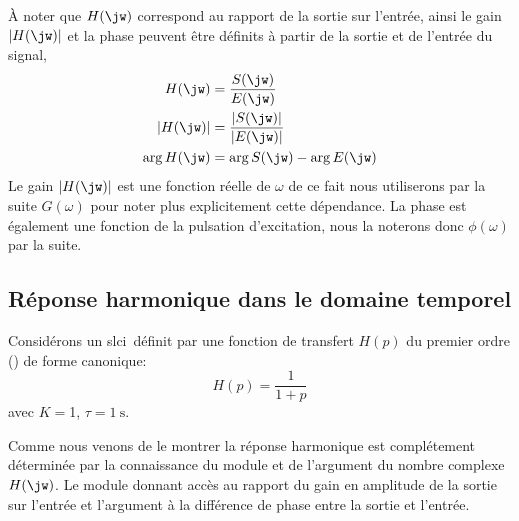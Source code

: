 \`A noter que $H(\jw)$ correspond au rapport de la sortie sur l'entrée,
ainsi le gain $|H(\jw)|$ et la phase peuvent être définits à partir de la 
sortie et de l'entrée du signal,
\begin{align*}
    H(\jw) &= \dfrac{S(\jw)}{E(\jw)} \\
    |H(\jw)|&= \dfrac{|S(\jw)|}{|E(\jw)|} \\
    \arg{H(\jw)}&=\arg{S(\jw)}-\arg{E(\jw)}
\end{align*}
Le gain $|H(\jw)|$ est une fonction réelle de $\omega$ de ce fait nous 
utiliserons par la suite $G(\omega)$ pour noter plus explicitement cette 
dépendance. La phase est également une fonction de la pulsation d'excitation, 
nous la noterons donc $\phi(\omega)$ par la suite.
{}
\captionsetup{width=0.9\linewidth}
\subsection*{Réponse harmonique dans le domaine temporel}
Considérons un \gls{slci}~définit par une fonction de transfert $H(p)$ du 
premier ordre () de forme canonique:
\[
H(p)=\dfrac{1}{1+p}
\]
avec $K=$1, $\tau=\SI{1}{\second}$.

Comme nous venons de le montrer la réponse harmonique est complétement 
déterminée par la connaissance du module et de l'argument du nombre complexe
$H(\jw)$. Le module donnant accès au rapport du gain en amplitude de la sortie 
sur l'entrée et l'argument à la différence de phase entre la sortie et l'entrée.

